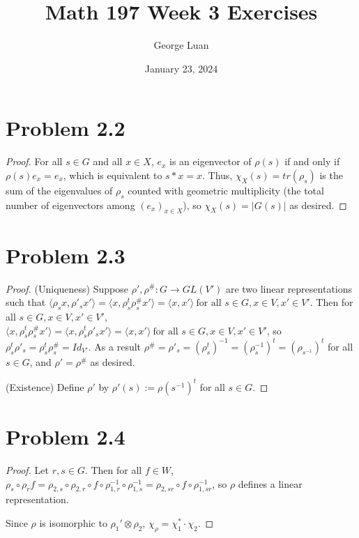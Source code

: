 \documentclass{article}
\title{Math 197 Week 3 Exercises}
\author{George Luan}
\date{January 23, 2024} %
\begin{document}
\maketitle

\section*{Problem 2.2}
\begin{proof}
    For all $s\in G$ and all $x \in X$, $e_{x}$ is an eigenvector of $\rho(s)$ if and only if $\rho(s)e_{x} = e_{x}$, which is equivalent to $s*x = x$. Thus, $\chi_{X}(s) = tr(\rho_s)$ is the sum of the eigenvalues of $\rho_{s}$ counted with geometric multiplicity (the total number of eigenvectors among $(e_{x})_{x \in X}$), so $\chi_{X}(s) = |G(s)|$ as desired.  
\end{proof}

\section*{Problem 2.3}
\begin{proof}
(Uniqueness) Suppose $\rho', \rho^\#: G \to GL(V')$ are two linear representations such that $\langle \rho_s x, \rho'_s x'\rangle = \langle x, \rho_s^{t}\rho^\#_s x'\rangle = \langle x, x' \rangle \ \text{for all } s \in G, x \in V, x' \in V'$.
Then for all $s \in G, x \in V, x' \in V'$, $\langle x, \rho_s^{t}\rho^{\#}_s x'\rangle = \langle x, \rho_s^{t}\rho'_s x'\rangle = \langle x, x' \rangle \ \text{for all } s \in G, x \in V, x' \in V'$, so $\rho_s^{t}\rho'_s = \rho_s^{t}\rho^\#_s = Id_{V'}$. As a result $\rho^\# = \rho'_s = (\rho_s^{t})^{-1} = (\rho_s^{-1})^{t} = (\rho_{s^{-1}})^{t}$ for all $s \in G$, and $\rho' = \rho^\#$ as desired.

(Existence) Define $\rho'$ by $\rho'(s) := \rho(s^{-1})^t$ for all $s \in G$.
\end{proof}


\section*{Problem 2.4}
\begin{proof}
    Let $r, s \in G$. Then for all $f \in W$, $\rho_s\circ\rho_r f = \rho_{2, s} \circ \rho_{2, r} \circ f \circ \rho_{1, r}^{-1} \circ \rho_{1, s}^{-1} = \rho_{2, sr} \circ f \circ \rho_{1, sr}^{-1}$, so $\rho$ defines a linear representation.

    Since $\rho$ is isomorphic to $\rho_1' \otimes \rho_2$, $\chi_\rho = \chi_{1}^* \cdot \chi_2$.
\end{proof}
\end{document}
